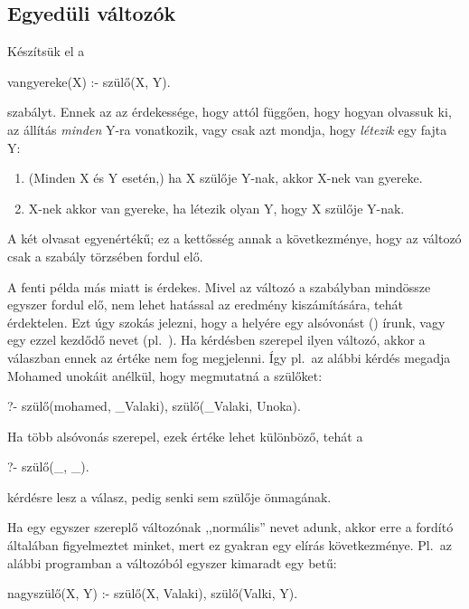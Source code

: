 \subsection*{Egyedüli változók}

Készítsük el a
\begin{program}
vangyereke(X) :- szülő(X, Y).
\end{program}
szabályt.  Ennek az az érdekessége, hogy attól
függően, hogy hogyan olvassuk ki, az állítás
\emph{minden} Y-ra vonatkozik, vagy csak azt
mondja, hogy \emph{létezik} egy fajta Y:

\begin{enumerate}
\item (Minden X és Y esetén,) ha X szülője Y-nak,
  akkor X-nek van gyereke.
\item X-nek akkor van gyereke, ha létezik olyan Y,
  hogy X szülője Y-nak.
\end{enumerate}
A két olvasat egyenértékű; ez a kettősség annak a
következménye, hogy az  változó csak a szabály
törzsében fordul elő.

A fenti példa más miatt is érdekes. Mivel az 
változó a szabályban mindössze egyszer fordul elő,
nem lehet hatással az eredmény kiszámítására, tehát
érdektelen. Ezt úgy szokás jelezni, hogy a helyére
egy alsóvonást (\pr{\_}) írunk, vagy egy ezzel
kezdődő nevet (pl.~).\index{\pr{\_}} Ha
kérdésben szerepel ilyen változó, akkor a válaszban
ennek az értéke nem fog megjelenni. Így pl.~az
alábbi kérdés megadja Mohamed unokáit anélkül, hogy
megmutatná a szülőket:
\begin{query}
?- szülő(mohamed, _Valaki), szülő(_Valaki, Unoka).
\end{query}

Ha több alsóvonás szerepel, ezek értéke lehet
különböző, tehát a
\begin{query}
?- szülő(_, _).
\end{query}
kérdésre  lesz a válasz, pedig senki sem
szülője önmagának.

Ha egy egyszer szereplő változónak ,,normális''
nevet adunk, akkor erre a fordító általában
figyelmeztet minket, mert ez gyakran egy elírás
következménye. Pl.~az alábbi programban a
 változóból egyszer kimaradt egy 
betű:
\begin{program}
nagyszülő(X, Y) :-
    szülő(X, Valaki), szülő(Valki, Y).
\end{program}

